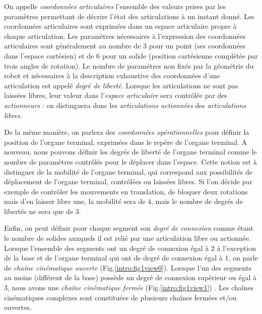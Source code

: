 On appelle {\it coordonnées articulaires} l'ensemble des valeurs prises par les paramètres permettant de décrire l'état des articulations à un instant donné. Les coordonnées articulaires sont exprimées dans un espace articulaire propre à chaque articulation. Les paramètres nécessaires à l'expression des coordonnées articulaires sont généralement au nombre de 3 pour un point (ses coordonnées dans l'espace cartésien) et de 6 pour un solide (position cartésienne complétée par trois angles de rotation). Le nombre de paramètres non fixés par la géométrie du robot et nécessaires à la description exhaustive des coordonnées d'une articulation est appelé {\it degré de liberté}. Lorsque les articulations ne sont pas laissées libres, leur valeur dans l'{\it espace articulaire} sera contr\^olée par des {\it actionneurs} : on distinguera donc les {\it articulations actionnées} des {\it articulations libres}.

De la même manière, on parlera des {\it coordonnées opérationnelles} pour définir la position de l'organe terminal, exprimées dans le repère de l'organe terminal. A nouveau, nous pouvons définir les degrés de liberté de l'organe terminal comme le nombre de paramètres contr\^olés pour le déplacer dans l'espace. Cette notion est à distinguer de la mobilité de l'organe terminal, qui correspond aux possibilités de déplacement de l'organe terminal, contrôlées ou laissées libres. Si l'on décide par exemple de contr\^oler les mouvements en translation, de bloquer deux rotations mais d'en laisser libre une, la mobilité sera de 4, mais le nombre de degrés de libertés ne sera que de 3.

Enfin, on peut définir pour chaque segment son {\it degré de connexion} comme étant le nombre de solides auxquels il est relié par une articulation libre ou actionnée. Lorsque l'ensemble des segments ont un degré de connexion égal à 2 à l'exception de la base et de l'organe terminal qui ont de degré de connexion égal à 1, on parle de {\it cha\^ine cinématique ouverte} (Fig.\ref{intro:fig1view0}). Lorsque l'un des segments au moins (différent de la base) possède un degré de connexion supérieur ou égal à 3, nous avons une {\it cha\^ine cinématique fermée} (Fig.\ref{intro:fig1view1}) \cite{journals/gosselin1989}. Les cha\^ines cinématiques complexes sont constituées de plusieurs cha\^ines fermées et/ou ouvertes.

